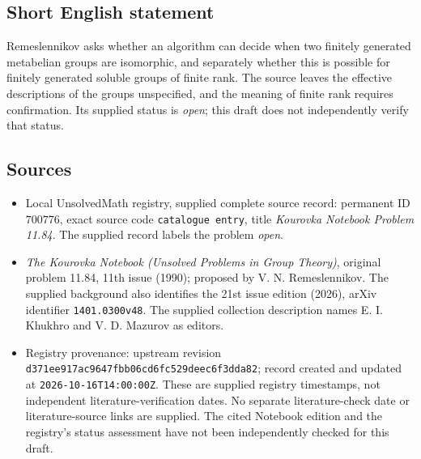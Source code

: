 \documentclass[11pt]{article}
\begin{document}
\subsection{Short English statement}
Remeslennikov asks whether an algorithm can decide when two finitely generated metabelian groups are isomorphic, and separately whether this is possible for finitely generated soluble groups of finite rank. The source leaves the effective descriptions of the groups unspecified, and the meaning of finite rank requires confirmation. Its supplied status is \emph{open}; this draft does not independently verify that status.
\subsection{Sources}
\begin{itemize}
\item Local UnsolvedMath registry, supplied complete source record: permanent ID \(700776\), exact source code \texttt{catalogue entry}, title \emph{Kourovka Notebook Problem 11.84}. The supplied record labels the problem \emph{open}.
\item \emph{The Kourovka Notebook (Unsolved Problems in Group Theory)}, original problem 11.84, 11th issue (1990); proposed by V. N. Remeslennikov. The supplied background also identifies the 21st issue edition (2026), arXiv identifier \texttt{1401.0300v48}. The supplied collection description names E. I. Khukhro and V. D. Mazurov as editors.
\item Registry provenance: upstream revision \texttt{d371ee917ac9647fbb06cd6fc529deec6f3dda82}; record created and updated at \texttt{2026-10-16T14:00:00Z}. These are supplied registry timestamps, not independent literature-verification dates. No separate literature-check date or literature-source links are supplied. The cited Notebook edition and the registry's status assessment have not been independently checked for this draft.
\end{itemize}
\end{document}
